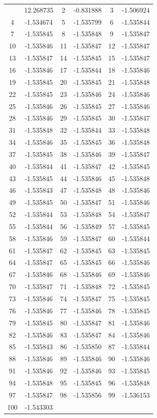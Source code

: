 \documentclass[12pt]{article}
\begin{document}
\begin{longtable}{@{}cc|cc|cc@{}}
\bottomrule
\endlastfoot
1 & 12.268735 & 2 & -0.831888 & 3 & -1.506924 \\
4 & -1.534674 & 5 & -1.535799 & 6 & -1.535844 \\
7 & -1.535845 & 8 & -1.535848 & 9 & -1.535847 \\
10 & -1.535846 & 11 & -1.535847 & 12 & -1.535847 \\
13 & -1.535847 & 14 & -1.535845 & 15 & -1.535847 \\
16 & -1.535846 & 17 & -1.535844 & 18 & -1.535846 \\
19 & -1.535845 & 20 & -1.535845 & 21 & -1.535848 \\
22 & -1.535845 & 23 & -1.535846 & 24 & -1.535846 \\
25 & -1.535846 & 26 & -1.535845 & 27 & -1.535846 \\
28 & -1.535846 & 29 & -1.535845 & 30 & -1.535847 \\
31 & -1.535848 & 32 & -1.535844 & 33 & -1.535848 \\
34 & -1.535846 & 35 & -1.535845 & 36 & -1.535848 \\
37 & -1.535845 & 38 & -1.535846 & 39 & -1.535847 \\
40 & -1.535844 & 41 & -1.535847 & 42 & -1.535845 \\
43 & -1.535845 & 44 & -1.535846 & 45 & -1.535848 \\
46 & -1.535843 & 47 & -1.535848 & 48 & -1.535846 \\
49 & -1.535845 & 50 & -1.535847 & 51 & -1.535846 \\
52 & -1.535844 & 53 & -1.535848 & 54 & -1.535847 \\
55 & -1.535844 & 56 & -1.535849 & 57 & -1.535845 \\
58 & -1.535846 & 59 & -1.535847 & 60 & -1.535844 \\
61 & -1.535847 & 62 & -1.535845 & 63 & -1.535845 \\
64 & -1.535847 & 65 & -1.535845 & 66 & -1.535846 \\
67 & -1.535846 & 68 & -1.535846 & 69 & -1.535846 \\
70 & -1.535847 & 71 & -1.535848 & 72 & -1.535845 \\
73 & -1.535846 & 74 & -1.535847 & 75 & -1.535845 \\
76 & -1.535846 & 77 & -1.535846 & 78 & -1.535845 \\
79 & -1.535845 & 80 & -1.535847 & 81 & -1.535846 \\
82 & -1.535846 & 83 & -1.535847 & 84 & -1.535846 \\
85 & -1.535843 & 86 & -1.535850 & 87 & -1.535844 \\
88 & -1.535846 & 89 & -1.535846 & 90 & -1.535846 \\
91 & -1.535846 & 92 & -1.535846 & 93 & -1.535845 \\
94 & -1.535848 & 95 & -1.535845 & 96 & -1.535848 \\
97 & -1.535847 & 98 & -1.535856 & 99 & -1.536153 \\
100 & -1.543303 &  &  &  &  \\

\end{longtable}
\end{document}
